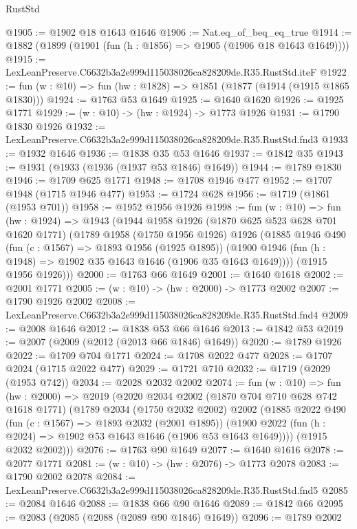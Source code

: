 \begin{lexlean}{RustStd}
\begin{coremodule}
@1905 := @1902 @18 @1643 @1646
@1906 := Nat.eq_of_beq_eq_true
@1914 := @1882 (@1899 (@1901 (fun (h : @1856) => @1905 (@1906 @18 @1643 @1649))))
@1915 := LexLeanPreserve.C6632b3a2e999d115038026ca828209de.R35.RustStd.iteF
@1922 := fun (w : @10) => fun (hw : @1828) => @1851 (@1877 (@1914 (@1915 @1865 @1830)))
@1924 := @1763 @53 @1649
@1925 := @1640 @1620
@1926 := @1925 @1771
@1929 := (w : @10) -> (hw : @1924) -> @1773 @1926
@1931 := @1790 @1830 @1926
@1932 := LexLeanPreserve.C6632b3a2e999d115038026ca828209de.R35.RustStd.fnd3
@1933 := @1932 @1646
@1936 := @1838 @35 @53 @1646
@1937 := @1842 @35
@1943 := @1931 (@1933 (@1936 (@1937 @53 @1846) @1649))
@1944 := @1789 @1830
@1946 := @1709 @625 @1771
@1948 := @1708 @1946 @477
@1952 := @1707 @1948 (@1715 @1946 @477)
@1953 := @1724 @628
@1956 := @1719 (@1861 (@1953 @701))
@1958 := @1952 @1956 @1926
@1998 := fun (w : @10) =>
  fun (hw : @1924) =>
  @1943
    (@1944
      @1958
      @1926
      (@1870 @625 @523 @628 @701 @1620 @1771)
      (@1789
        @1958
        (@1750 @1956 @1926)
        @1926
        (@1885
          @1946
          @490
          (fun (c : @1567) => @1893 @1956 (@1925 @1895))
          (@1900 @1946 (fun (h : @1948) => @1902 @35 @1643 @1646 (@1906 @35 @1643 @1649))))
        (@1915 @1956 @1926)))
@2000 := @1763 @66 @1649
@2001 := @1640 @1618
@2002 := @2001 @1771
@2005 := (w : @10) -> (hw : @2000) -> @1773 @2002
@2007 := @1790 @1926 @2002
@2008 := LexLeanPreserve.C6632b3a2e999d115038026ca828209de.R35.RustStd.fnd4
@2009 := @2008 @1646
@2012 := @1838 @53 @66 @1646
@2013 := @1842 @53
@2019 := @2007 (@2009 (@2012 (@2013 @66 @1846) @1649))
@2020 := @1789 @1926
@2022 := @1709 @704 @1771
@2024 := @1708 @2022 @477
@2028 := @1707 @2024 (@1715 @2022 @477)
@2029 := @1721 @710
@2032 := @1719 (@2029 (@1953 @742))
@2034 := @2028 @2032 @2002
@2074 := fun (w : @10) =>
  fun (hw : @2000) =>
  @2019
    (@2020
      @2034
      @2002
      (@1870 @704 @710 @628 @742 @1618 @1771)
      (@1789
        @2034
        (@1750 @2032 @2002)
        @2002
        (@1885
          @2022
          @490
          (fun (c : @1567) => @1893 @2032 (@2001 @1895))
          (@1900 @2022 (fun (h : @2024) => @1902 @53 @1643 @1646 (@1906 @53 @1643 @1649))))
        (@1915 @2032 @2002)))
@2076 := @1763 @90 @1649
@2077 := @1640 @1616
@2078 := @2077 @1771
@2081 := (w : @10) -> (hw : @2076) -> @1773 @2078
@2083 := @1790 @2002 @2078
@2084 := LexLeanPreserve.C6632b3a2e999d115038026ca828209de.R35.RustStd.fnd5
@2085 := @2084 @1646
@2088 := @1838 @66 @90 @1646
@2089 := @1842 @66
@2095 := @2083 (@2085 (@2088 (@2089 @90 @1846) @1649))
@2096 := @1789 @2002

\end{coremodule}
\end{lexlean}
